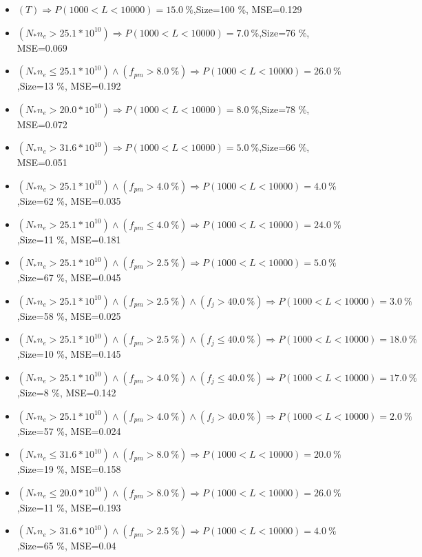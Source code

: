 \documentclass[numbered]{CSL}
\begin{document}
\begin{itemize}
\item $(T) \Rightarrow P(1 000 < L < 10 000) = 15.0~\%$,\hfill Size=100 \%, MSE=0.129
\item $(N_* n_e > 25.1 * 10^{10}) \Rightarrow P(1 000 < L < 10 000) = 7.0~\%$,\hfill Size=76 \%, MSE=0.069
\item $(N_* n_e \leq 25.1 * 10^{10}) \land (f_{pm} > 8.0~\%) \Rightarrow P(1 000 < L < 10 000) = 26.0~\%$,\hfill Size=13 \%, MSE=0.192
\item $(N_* n_e > 20.0 * 10^{10}) \Rightarrow P(1 000 < L < 10 000) = 8.0~\%$,\hfill Size=78 \%, MSE=0.072
\item $(N_* n_e > 31.6 * 10^{10}) \Rightarrow P(1 000 < L < 10 000) = 5.0~\%$,\hfill Size=66 \%, MSE=0.051
\item $(N_* n_e > 25.1 * 10^{10}) \land (f_{pm} > 4.0~\%) \Rightarrow P(1 000 < L < 10 000) = 4.0~\%$,\hfill Size=62 \%, MSE=0.035
\item $(N_* n_e > 25.1 * 10^{10}) \land (f_{pm} \leq 4.0~\%) \Rightarrow P(1 000 < L < 10 000) = 24.0~\%$,\hfill Size=11 \%, MSE=0.181
\item $(N_* n_e > 25.1 * 10^{10}) \land (f_{pm} > 2.5~\%) \Rightarrow P(1 000 < L < 10 000) = 5.0~\%$,\hfill Size=67 \%, MSE=0.045
\item $(N_* n_e > 25.1 * 10^{10}) \land (f_{pm} > 2.5~\%) \land (f_j > 40.0~\%) \Rightarrow P(1 000 < L < 10 000) = 3.0~\%$,\hfill Size=58 \%, MSE=0.025
\item $(N_* n_e > 25.1 * 10^{10}) \land (f_{pm} > 2.5~\%) \land (f_j \leq 40.0~\%) \Rightarrow P(1 000 < L < 10 000) = 18.0~\%$,\hfill Size=10 \%, MSE=0.145
\item $(N_* n_e > 25.1 * 10^{10}) \land (f_{pm} > 4.0~\%) \land (f_j \leq 40.0~\%) \Rightarrow P(1 000 < L < 10 000) = 17.0~\%$,\hfill Size=8 \%, MSE=0.142
\item $(N_* n_e > 25.1 * 10^{10}) \land (f_{pm} > 4.0~\%) \land (f_j > 40.0~\%) \Rightarrow P(1 000 < L < 10 000) = 2.0~\%$,\hfill Size=57 \%, MSE=0.024
\item $(N_* n_e \leq 31.6 * 10^{10}) \land (f_{pm} > 8.0~\%) \Rightarrow P(1 000 < L < 10 000) = 20.0~\%$,\hfill Size=19 \%, MSE=0.158
\item $(N_* n_e \leq 20.0 * 10^{10}) \land (f_{pm} > 8.0~\%) \Rightarrow P(1 000 < L < 10 000) = 26.0~\%$,\hfill Size=11 \%, MSE=0.193
\item $(N_* n_e > 31.6 * 10^{10}) \land (f_{pm} > 2.5~\%) \Rightarrow P(1 000 < L < 10 000) = 4.0~\%$,\hfill Size=65 \%, MSE=0.04

\end{itemize}
\end{document}
